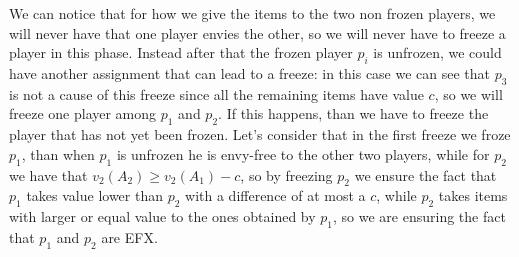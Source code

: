   We can notice that for how we give the items to the two non frozen players, we will never have that one player envies the other, so we will never have to freeze a player in this phase. Instead after that the frozen player $p_i$ is unfrozen, we could have another assignment that can lead to a freeze: in this case we can see that $p_3$ is not a cause of this freeze since all the remaining items have value $c$, so we will freeze one player among $p_1$ and $p_2$. If this happens, than we have to freeze the player that has not yet been frozen. Let's consider that in the first freeze we froze $p_1$, than when $p_1$ is unfrozen he is envy-free to the other two players, while for $p_2$ we have that $v_2(A_2) \ge v_2(A_1) - c$, so by freezing $p_2$ we ensure the fact that $p_1$ takes value lower than $p_2$ with a difference of at most a $c$, while $p_2$ takes items with larger or equal value to the ones obtained by $p_1$, so we are ensuring the fact that $p_1$ and $p_2$ are EFX.

